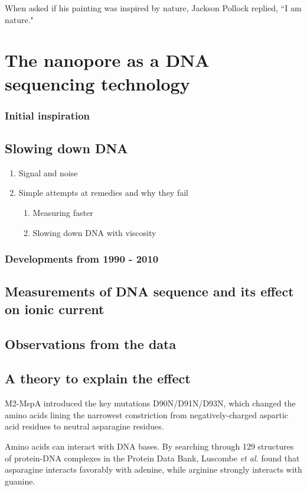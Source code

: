 \begin{savequote}[75mm]
When asked if his painting was inspired by nature, Jackson Pollock replied, ``I am nature."
\end{savequote}

\chapter{The nanopore as a DNA sequencing technology}
\label{dna_sequencing}

\subsection{Initial inspiration}

\section{Slowing down DNA}
\begin{enumerate}
\item Signal and noise
\item Simple attempts at remedies and why they fail
\begin{enumerate}
\item Measuring faster
\item Slowing down DNA with viscosity
\end{enumerate}
\end{enumerate}

\subsection{Developments from 1990 - 2010}

\section{Measurements of DNA sequence and its effect on ionic current}

\section{Observations from the data}

\section{A theory to explain the effect}

M2-MspA introduced the key mutations D90N/D91N/D93N, which changed the amino acids lining the narrowest constriction from negatively-charged aspartic acid residues to neutral asparagine residues.

Amino acids can interact with DNA bases.  By searching through 129 structures of protein-DNA complexes in the Protein Data Bank, Luscombe \textit{et al.} \citep{Luscombe2001} found that asparagine interacts favorably with adenine, while arginine strongly interacts with guanine.